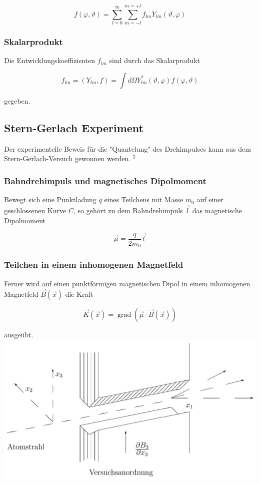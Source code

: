 \documentclass[10pt, letterpaper]{article}
\begin{document}
$$
f(\varphi, \vartheta)=\sum_{l=0}^{\infty} \sum_{m=-l}^{m=+l} f_{l m} Y_{l m}(\vartheta, \varphi)
$$

\subsubsection*{Skalarprodukt}
Die Entwicklungskoeffizienten $f_{l m}$ sind durch das Skalarprodukt

$$
f_{l m}=\left(Y_{l m}, f\right)=\int d \Omega Y_{l m}^{*}(\vartheta, \varphi) f(\varphi, \vartheta)
$$

gegeben.

\subsection*{Stern-Gerlach Experiment}
Der experimentelle Beweis für die "Quantelung" des Drehimpulses kann aus dem Stern-Gerlach-Versuch gewonnen werden. ${ }^{5}$

\subsubsection*{Bahndrehimpuls und magnetisches Dipolmoment}
Bewegt sich eine Punktladung $q$ eines Teilchens mit Masse $m_{0}$ auf einer geschlossenen Kurve $C$, so gehört zu dem Bahndrehimpuls $\vec{l}$ das magnetische Dipolmoment

$$
\vec{\mu}=\frac{q}{2 m_{0}} \vec{l}
$$

\subsubsection*{Teilchen in einem inhomogenen Magnetfeld}
Ferner wird auf einen punktförmigen magnetischen Dipol in einem inhomogenen Magnetfeld $\vec{B}(\vec{x})$ die Kraft

$$
\vec{K}(\vec{x})=\operatorname{grad}(\vec{\mu} \cdot \vec{B}(\vec{x}))
$$

ausgeübt.\\
\includegraphics[scale=0.2, center]{2025_05_21_5017aafc65fbb33f9443g-14}
\end{document}

